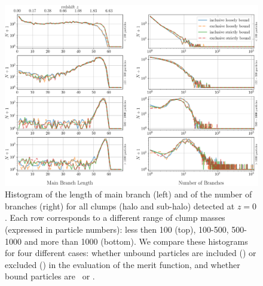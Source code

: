 \begin{figure}
  \centering
  \includegraphics[width=\textwidth,keepaspectratio]{images/tree-statistics-my-threshold/tree_geometry-inc-excl.png}
  \caption{Histogram of the length of main branch (left) and of the
    number of branches (right) for all clumps (halo and sub-halo)
    detected at $z=0$. Each row corresponds to a different range of
    clump masses (expressed in particle numbers): less then 100 (top),
    100-500, 500-1000 and more than 1000 (bottom). We compare these
    histograms for four different cases: whether unbound particles are
    included (\inc) or excluded (\exc) in the evaluation of the merit
    function, and whether bound particles are \nosad\ or \sad.
  }%
  \label{fig:saddle_nosaddle_mbl_nbranch}
\end{figure}

